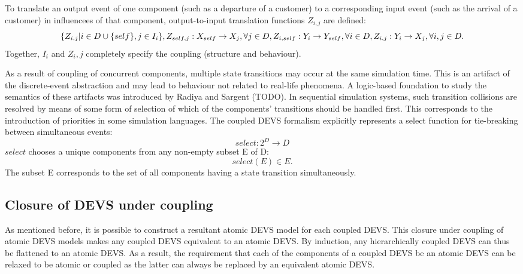 To translate an output event of one component (such as a departure of a customer) to a corresponding input event (such as the 
arrival of a customer) in influencees of that component, output-to-input translation functions $Z_{i,j}$ are defined:
\begin{equation}
    \{ Z_{i,j} | i \in D \cup \{self\}, j \in I_i\}, \\
    Z_{self, j} : X_{self} \rightarrow X_j, \forall j \in D, \\
    Z_{i, self} : Y_i \rightarrow Y_{self}, \forall i \in D, \\
    Z_{i, j} : Y_i \rightarrow X_j, \forall i,j \in D.
\end{equation}
Together, $I_i$ and $Z_i,j$ completely specify the coupling (structure and behaviour).

As a result of coupling of concurrent components, multiple state transitions may occur at the same simulation time. This is 
an artifact of the discrete-event abstraction and may lead to behaviour not related to real-life phenomena. A logic-based 
foundation to study the semantics of these artifacts was introduced by Radiya and Sargent (TODO). In sequential simulation 
systems, such transition collisions are resolved by means of some form of selection of which of the components' transitions 
should be handled first. This corresponds to the introduction of priorities in some simulation languages. The coupled DEVS 
formalism explicitly represents a select function for tie-breaking between simultaneous events:
\begin{equation}
    select : 2^D \rightarrow D
\end{equation}
$select$ chooses a unique components from any non-empty subset E of D:
\begin{equation}
    select(E) \in E.
\end{equation}
The subset E corresponds to the set of all components having a state transition simultaneously.

\subsection{Closure of DEVS under coupling}
As mentioned before, it is possible to construct a resultant atomic DEVS model for each coupled DEVS. This closure under 
coupling of atomic DEVS models makes any coupled DEVS equivalent to an atomic DEVS. By induction, any hierarchically coupled 
DEVS can thus be flattened to an atomic DEVS. As a result, the requirement that each of the components of a coupled DEVS be 
an atomic DEVS can be relaxed to be atomic or coupled as the latter can always be replaced by an equivalent atomic DEVS.

